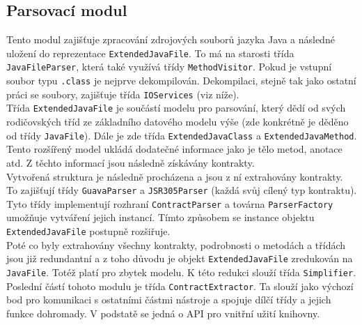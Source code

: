 				

		\subsection{Parsovací modul}
			Tento modul zajišťuje zpracování zdrojových souborů jazyka Java a následné uložení do reprezentace \texttt{ExtendedJavaFile}. To má na starosti třída \texttt{JavaFileParser}, která také využívá třídy \texttt{MethodVisitor}. Pokud je vstupní soubor typu \texttt{.class} je nejprve dekompilován. Dekompilaci, stejně tak jako ostatní práci se soubory, zajišťuje třída \texttt{IOServices} (viz níže).\\
			
			Třída \texttt{ExtendedJavaFile} je součástí modelu pro parsování, který dědí od svých rodičovských tříd ze základního datového modelu výše (zde konkrétně je děděno od třídy \texttt{JavaFile}). Dále je zde třída \texttt{ExtendedJavaClass} a \texttt{ExtendedJavaMethod}. Tento rozšířený model ukládá dodatečné informace jako je tělo metod, anotace atd. Z těchto informací jsou následně získávány kontrakty.\\
			
			Vytvořená struktura je následně procházena a jsou z ní extrahovány kontrakty. To zajišťují třídy \texttt{GuavaParser} a \texttt{JSR305Parser} (každá svůj cílený typ kontraktu). Tyto třídy implementují rozhraní \texttt{ContractParser} a továrna \texttt{ParserFactory} umožňuje vytváření jejich instancí. Tímto způsobem se instance objektu \texttt{ExtendedJavaFile} postupně rozšiřuje.\\
			
			Poté co byly extrahovány všechny kontrakty, podrobnosti o metodách a třídách jsou již redundantní a z toho důvodu je objekt \texttt{ExtendedJavaFile} zredukován na \texttt{JavaFile}. Totéž platí pro zbytek modelu. K této redukci slouží třída \texttt{Simplifier}.\\
			
			Poslední částí tohoto modulu je třída \texttt{ContractExtractor}. Ta slouží jako výchozí bod pro komunikaci s ostatními částmi nástroje a spojuje dílčí třídy a jejich funkce dohromady. V podstatě se jedná o API pro vnitřní užití knihovny.\\
			
